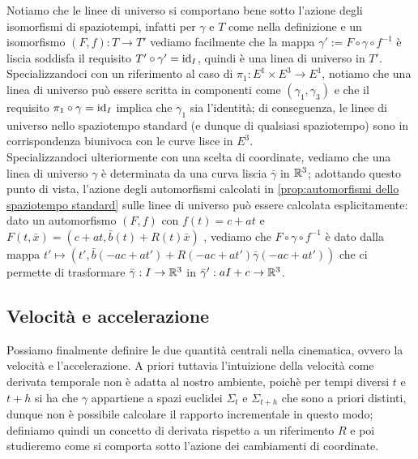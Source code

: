 \documentclass[openany]{book}
\begin{document}
Notiamo che le linee di universo si comportano bene sotto l'azione degli isomorfismi di spaziotempi, infatti per $\gamma$ e $T$ come nella definizione e un isomorfismo $(F,f) : T\to T'$ vediamo facilmente che la mappa $\gamma ' := F\circ \gamma \circ f^{-1}$ è liscia soddisfa il requisito $T'\circ \gamma' = \operatorname{id}_I$, quindi è una linea di universo in $T'$.\\
Specializzandoci con un riferimento al caso di $\pi_1:E^1\times E^3\to E^1$, notiamo che una linea di universo può essere scritta in componenti come $(\gamma_1,\gamma_3)$ e che il requisito $\pi_1\circ \gamma = \operatorname{id}_I$ implica che $\gamma_1$ sia l'identità; di conseguenza, le linee di universo nello spaziotempo standard (e dunque di qualsiasi spaziotempo) sono in corrispondenza biunivoca con le curve lisce in $E^3$.\\
Specializzandoci ulteriormente con una scelta di coordinate, vediamo che una linea di universo $\gamma$ è determinata da una curva liscia $\bar{\gamma}$ in $\mathbb{R}^3$; adottando questo punto di vista, l'azione degli automorfismi calcolati in \cref{prop:automorfismi dello spaziotempo standard} sulle linee di universo può essere calcolata esplicitamente: dato un automorfismo $(F,f)$ con $f(t)= c+at$ e $F(t,\bar x)= (c+at, \bar b(t) + R(t)\bar x )$ , vediamo che $F\circ\gamma\circ f^{-1}$ è dato dalla mappa $t' \mapsto (t', \bar b(-ac +at') + R(-ac+at')\bar \gamma (-ac +at') )$ che ci permette di trasformare $\bar \gamma : I \to \mathbb{R}^3$ in $\bar \gamma' : aI+c \to \mathbb{R}^3$.

\newcommand\tv{\text{(tv)}}
\newcommand\cor{\text{(cor)}}
\subsection{Velocità e accelerazione}

Possiamo finalmente definire le due quantità centrali nella cinematica, ovvero la velocità e l'accelerazione. A priori tuttavia l'intuizione della velocità come derivata temporale non è adatta al nostro ambiente, poichè per tempi diversi $t$ e $t+h$ si ha che $\gamma$ appartiene a spazi euclidei $\Sigma_t$ e $\Sigma_{t+h}$ che sono a priori distinti, dunque non è possibile calcolare il rapporto incrementale in questo modo; definiamo quindi un concetto di derivata rispetto a un riferimento $R$ e poi studieremo come si comporta sotto l'azione dei cambiamenti di coordinate.
\end{document}
